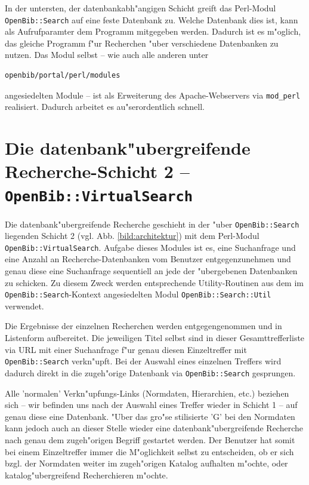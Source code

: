 \documentclass[11pt, twoside, a4paper, BCOR8mm, DIV12, bibtotoc,idxtotoc]{scrbook}
\begin{document}
\begin{itemize}
In der untersten, der datenbankabh"angigen Schicht greift das
Perl-Modul \texttt{OpenBib::Search} auf eine feste Datenbank zu.
Welche Datenbank dies ist, kann als Aufrufparamter dem Programm
mitgegeben werden. Dadurch ist es m"oglich, das gleiche Programm f"ur
Recherchen "uber ver\-schie\-de\-ne Daten\-banken zu nutzen. Das Modul
selbst -- wie auch alle anderen unter
\begin{verbatim}
openbib/portal/perl/modules
\end{verbatim}
angesiedelten Module -- ist als Erweiterung des Apache-Webservers via
\texttt{mod\_perl} realisiert.  Dadurch arbeitet es au"ser\-ordentlich
schnell.


\section{Die datenbank"ubergreifende Recherche-Schicht 2 -- \texttt{OpenBib::VirtualSearch}}

Die datenbank"ubergreifende Recherche geschieht in der "uber
\texttt{OpenBib::Search} liegenden Schicht 2 (vgl. Abb.
\ref{bild:architektur}) mit dem Perl-Modul
\texttt{OpenBib::VirtualSearch}. Aufgabe dieses Modules ist es, eine
Suchanfrage und eine Anzahl an Recherche-Datenbanken vom Benutzer
entgegen\-zuneh\-men und genau diese eine Suchanfrage sequentiell an
jede der "ubergebenen Datenbanken zu schicken. Zu diesem Zweck werden
entsprechende Utility-Routinen aus dem im
\texttt{OpenBib::Search}-Kontext angesiedelten Modul
\texttt{OpenBib::Search::Util} verwendet.

Die Ergebnisse der einzelnen Recherchen werden entgegengenommen und in
Listenform auf\-be\-rei\-tet. Die jeweiligen Titel selbst sind in dieser
Gesamttrefferliste via URL mit einer Suchanfrage f"ur genau diesen
Einzeltreffer mit \texttt{OpenBib::Search} verkn"upft. 
Bei der
Auswahl eines einzelnen Treffers wird dadurch direkt in die
zugeh"orige Datenbank via \texttt{OpenBib::Search} gesprungen. 

Alle 'normalen' Verkn"upfungs-Links (Normdaten, Hierarchien, etc.)
beziehen sich -- wir befinden uns nach der Auswahl eines Treffer wieder in
Schicht 1 -- auf genau diese eine Datenbank. "Uber das gro"se
stilisierte 'G' bei den Normdaten kann jedoch auch an dieser Stelle
wieder eine datenbank"ubergreifende Recherche nach genau dem
zugeh"origen Begriff gestartet werden. Der Benutzer hat somit bei
einem Einzeltreffer immer die M"oglichkeit selbst zu entscheiden, ob
er sich bzgl. der Normdaten weiter im zugeh"origen Katalog aufhalten
m"ochte, oder katalog"ubergreifend Recherchieren m"ochte.


\end{itemize}
\end{document}
